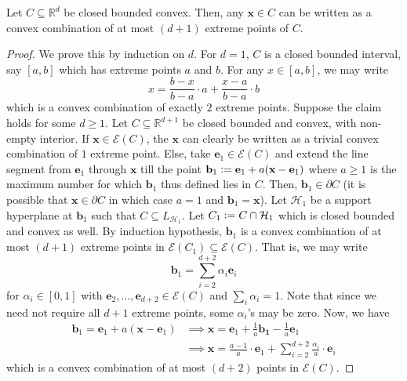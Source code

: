 \begin{thm}
    Let $C \subseteq \mathbb{R}^d$ be closed bounded convex. Then, any $\mathbf{x} \in C$ can be written as a convex combination of at most $(d+1)$ extreme points of $C$. 
\end{thm}
\begin{proof}
    We prove this by induction on $d$. For $d = 1$, $C$ is a closed bounded interval, say $[a,b]$ which has extreme points $a$ and $b$. For any $x \in [a,b]$, we may write
    \[
        x = \frac{b-x}{b-a} \cdot a + \frac{x-a}{b-a} \cdot b
    \]
    which is a convex combination of exactly $2$ extreme points. Suppose the claim holds for some $d \geq 1$. Let $C \subseteq \mathbb{R}^{d+1}$ be closed bounded and convex, with non-empty interior. If $\mathbf{x} \in \mathcal{E}(C)$, the $\mathbf{x}$ can clearly be written as a trivial convex combination of $1$ extreme point. Else, take $\mathbf{e}_1 \in \mathcal{E}(C)$ and extend the line segment from $\mathbf{e}_1$ through $\mathbf{x}$ till the point $\mathbf{b}_1 \vcentcolon= \mathbf{e}_1 + a(\mathbf{x} - \mathbf{e}_1)$ where $a \geq 1$ is the maximum number for which $\mathbf{b}_1$ thus defined lies in $C$. Then, $\mathbf{b}_1 \in \partial C$ (it is possible that $\mathbf{x} \in \partial C$ in which case $a = 1$ and $\mathbf{b}_1 = \mathbf{x}$). Let $\mathcal{H}_1$ be a support hyperplane at $\mathbf{b}_1$ such that $C \subseteq L_{\mathcal{H}_1}$. Let $C_1 \vcentcolon= C \cap \mathcal{H}_1$ which is closed bounded and convex as well. By induction hypothesis, $\mathbf{b}_1$ is a convex combination of at most $(d+1)$ extreme points in $\mathcal{E}(C_1) \subseteq \mathcal{E}(C)$. That is, we may write
    \[
        \mathbf{b}_1 = \sum_{i=2}^{d+2} \alpha_i \mathbf{e}_i
    \]
    for $\alpha_i \in [0,1]$ with $\mathbf{e}_2, \ldots, \mathbf{e}_{d+2} \in \mathcal{E}(C)$ and $\sum_i \alpha_i = 1$. Note that since we need not require all $d+1$ extreme points, some $\alpha_i$'s may be zero. Now, we have
    \begin{align*}
        \mathbf{b}_1 = \mathbf{e}_1 + a(\mathbf{x} - \mathbf{e}_1) &\implies \mathbf{x} = \mathbf{e}_1 + \frac{1}{a} \mathbf{b_1} - \frac{1}{a} \mathbf{e}_1 \\
        &\implies \mathbf{x} = \frac{a-1}{a} \cdot \mathbf{e}_1 + \sum_{i=2}^{d+2} \frac{\alpha_i}{a} \cdot \mathbf{e}_i
    \end{align*}
    which is a convex combination of at most $(d+2)$ points in $\mathcal{E}(C)$. 
\end{proof}

